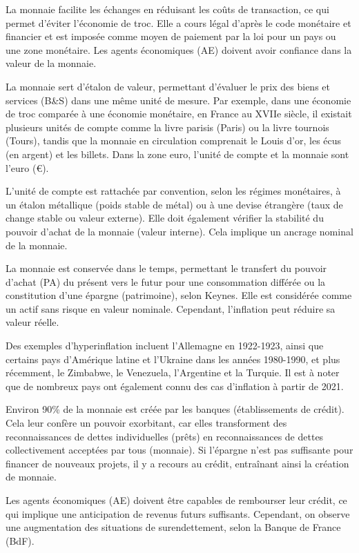 \documentclass[a4paper, 12pt]{report}
\begin{document}
La monnaie facilite les échanges en réduisant les coûts de transaction, ce qui permet d'éviter l'économie de troc. Elle a cours légal d'après le code monétaire et financier et est imposée comme moyen de paiement par la loi pour un pays ou une zone monétaire. Les agents économiques (AE) doivent avoir confiance dans la valeur de la monnaie.

La monnaie sert d'étalon de valeur, permettant d'évaluer le prix des biens et services (B\&S) dans une même unité de mesure. Par exemple, dans une économie de troc comparée à une économie monétaire, en France au XVIIe siècle, il existait plusieurs unités de compte comme la livre parisis (Paris) ou la livre tournois (Tours), tandis que la monnaie en circulation comprenait le Louis d'or, les écus (en argent) et les billets. Dans la zone euro, l'unité de compte et la monnaie sont l'euro (\euro).

L'unité de compte est rattachée par convention, selon les régimes monétaires, à un étalon métallique (poids stable de métal) ou à une devise étrangère (taux de change stable ou valeur externe). Elle doit également vérifier la stabilité du pouvoir d'achat de la monnaie (valeur interne). Cela implique un ancrage nominal de la monnaie.

La monnaie est conservée dans le temps, permettant le transfert du pouvoir d'achat (PA) du présent vers le futur pour une consommation différée ou la constitution d'une épargne (patrimoine), selon Keynes. Elle est considérée comme un actif sans risque en valeur nominale. Cependant, l'inflation peut réduire sa valeur réelle.

Des exemples d'hyperinflation incluent l'Allemagne en 1922-1923, ainsi que certains pays d'Amérique latine et l'Ukraine dans les années 1980-1990, et plus récemment, le Zimbabwe, le Venezuela, l'Argentine et la Turquie. Il est à noter que de nombreux pays ont également connu des cas d'inflation à partir de 2021.

Environ 90\% de la monnaie est créée par les banques (établissements de crédit). Cela leur confère un pouvoir exorbitant, car elles transforment des reconnaissances de dettes individuelles (prêts) en reconnaissances de dettes collectivement acceptées par tous (monnaie). Si l'épargne n'est pas suffisante pour financer de nouveaux projets, il y a recours au crédit, entraînant ainsi la création de monnaie. 

Les agents économiques (AE) doivent être capables de rembourser leur crédit, ce qui implique une anticipation de revenus futurs suffisants. Cependant, on observe une augmentation des situations de surendettement, selon la Banque de France (BdF).
\end{document}
